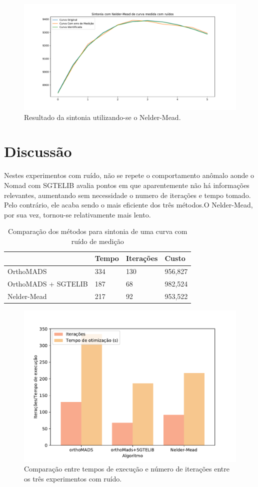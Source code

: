 \begin{figure}[H]
\centering
  \includegraphics[width=1\linewidth]{figs/curva_nm.pdf}
  \caption{Resultado da sintonia utilizando-se o Nelder-Mead.}
  \label{fig:exp2_nm_curve}
\end{figure}

\section{Discussão}
Nestes experimentos com ruído, não se repete o comportamento anômalo aonde o Nomad com SGTELIB avalia pontos em que aparentemente não há informações relevantes, aumentando sem necessidade o numero de iterações e tempo tomado.
%
Pelo contrário, ele acaba sendo o mais eficiente dos três métodos.O Nelder-Mead, por sua vez, tornou-se relativamente mais lento.

%

%

\begin{table}[H]
\centering
\caption{Comparação dos métodos para sintonia de uma curva com ruído de medição}
\label{my-label2}
\begin{tabular}{|l|l|l|l|}
\hline
                    & Tempo & Iterações & Custo   \\ \hline
OrthoMADS           & 334   & 130       & 956,827 \\ \hline
OrthoMADS + SGTELIB & 187   & 68        & 982,524 \\ \hline
Nelder-Mead         & 217   & 92        & 953,522 \\ \hline
\end{tabular}
\end{table}




\begin{figure}[H]
\centering
  \includegraphics[width=0.7\linewidth]{figs/comp_time_iter_2.pdf}
  \caption{Comparação entre tempos de execução e número de iterações entre os três experimentos com ruído.}
  \label{fig:comp1}
\end{figure}






